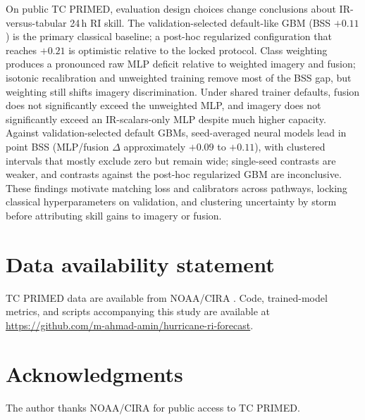\documentclass[11pt]{article}
\begin{document}
On public {TC PRIMED}, evaluation design choices change conclusions about IR-versus-tabular 24\,h RI skill. The validation-selected default-like GBM (BSS $+0.11$) is the primary classical baseline; a post-hoc regularized configuration that reaches $+0.21$ is optimistic relative to the locked protocol. Class weighting produces a pronounced raw MLP deficit relative to weighted imagery and fusion; isotonic recalibration and unweighted training remove most of the BSS gap, but weighting still shifts imagery discrimination. Under shared trainer defaults, fusion does not significantly exceed the unweighted MLP, and imagery does not significantly exceed an IR-scalars-only MLP despite much higher capacity. Against validation-selected default GBMs, seed-averaged neural models lead in point BSS (MLP/fusion $\Delta$ approximately $+0.09$ to $+0.11$), with clustered intervals that mostly exclude zero but remain wide; single-seed contrasts are weaker, and contrasts against the post-hoc regularized GBM are inconclusive. These findings motivate matching loss and calibrators across pathways, locking classical hyperparameters on validation, and clustering uncertainty by storm before attributing skill gains to imagery or fusion.

\section*{Data availability statement}
{TC PRIMED} data are available from NOAA/CIRA \citep{razin2023,tcprimed}. Code, trained-model metrics, and scripts accompanying this study are available at \url{https://github.com/m-ahmad-amin/hurricane-ri-forecast}.

\section*{Acknowledgments}
The author thanks NOAA/CIRA for public access to {TC PRIMED}.



\end{document}
